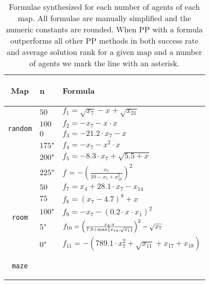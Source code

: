 \documentclass[letterpaper]{article} %
\renewcommand{\max}{\operatornamewithlimits{max}\limits}
\begin{document}
\begin{table}[t!]
        \caption{Formulae synthesized for each number of agents of each map. All formulae are manually simplified and the numeric constants are rounded. When PP with a formula outperforms all other PP methods in both success rate and average solution rank for a given map and a number of agents we mark the line with an asterisk.}
        \label{tab:all_maps_synth_results}
        \centering
        {\small
        \begin{tabular}{c|l|l}
            \toprule
            \begin{turn}{90} \textbf{Map} \end{turn} & \textbf{n} & \textbf{Formula} \\
            \midrule
            \multirow{4}{*}{\begin{turn}{90} {\tt random} \end{turn}}
            & $ 50 $ & $ f_{1} = \sqrt{x_{7}} - x_{} + \sqrt{x_{21}} $ \\
            & $ 100 $ & $ f_{2} = - x_{7} - x_{} \cdot x_{} $ \\
            & $ 0 $ & $ f_{3} = - 21.2 \cdot x_{7} - x_{} $ \\
            & $ 175^\star $ & $ f_{4} = -x_{7} - x_{}^2 \cdot x_{} $ \\
            & $ 200^\star $ & $ f_{5} = - 8.3 \cdot x_{7} + \sqrt{5.5 + x_{}} $ \\
            & $ 225^\star $ & $ f_{} = -\left(\frac{x_{7}}{10 - x_{1} + x_{18}^2}\right)^2 $ \\
            \hline
            \multirow{5}{*}{\begin{turn}{90} {\tt room} \end{turn}}
            & $ 50 $ & $ f_{7} = x_{4} + 28.1 \cdot x_{7} - x_{14} $ \\
            & $ 75 $ & $ f_{8} = \left(x_{7} - 4.7\right)^8 + x_{} $ \\
            & $ 100^\star $ & $ f_{9} = - x_{7} - \left(0.2 \cdot x_{} \cdot x_{1}\right)^2 $ \\
            & $ 5^\star $ & $ f_{10} = \left(\frac{x_{4} \cdot x_{}}{7.9 + \max\left\{x_{14}, \sqrt{x_{1}}\right\}}\right)^2 -\sqrt{x_{7}} $ \\
            & $ 0^\star $ & $ f_{11} = -(789.1 \cdot x_{7}^2 + \sqrt{x_{11}} + x_{17} + x_{18}) $ \\
            \hline
            \multirow{5}{*}{\begin{turn}{90} {\tt maze} \end{turn}}

\end{tabular}}
\end{table}
\end{document}
